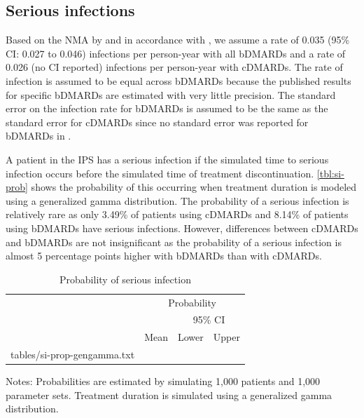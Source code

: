 \documentclass[11pt,final,fleqn]{article}\usepackage[]{graphicx}\usepackage[]{color}
\makeatletter
\theoremstyle{plain}
\newcommand*\ExpandableInput[1]{\@@input#1 }
\makeatother
\begin{document}
\subsection{Serious infections}
Based on the NMA by \citet{singh2011adverse} and in accordance with \citet{stevenson2016adalimumab}, we assume a rate of 0.035 (95\% CI: 0.027 to 0.046) infections per person-year with all bDMARDs and a rate of 0.026 (no CI reported) infections per person-year with cDMARDs. The rate of infection is assumed to be equal across bDMARDs because the published results for specific bDMARDs are estimated with very little precision. The standard error on the infection rate for bDMARDs is assumed to be the same as the standard error for cDMARDs since no standard error was reported for bDMARDs in \citet{singh2011adverse}.



A patient in the IPS has a serious infection if the simulated time to serious infection occurs before the simulated time of treatment discontinuation. \autoref{tbl:si-prob} shows the probability of this occurring when treatment duration is modeled using a generalized gamma distribution. The probability of a serious infection is relatively rare as only 3.49\% of patients using cDMARDs and 8.14\% of patients using bDMARDs have serious infections. However, differences between cDMARDs and bDMARDs are not insignificant as the probability of a serious infection is almost 5 percentage points higher with bDMARDs than with cDMARDs.

\begin{table}[!ht]
\begin{center}
\begin{threeparttable}
\caption{Probability of serious infection} \label{tbl:si-prob}
\begin{tabularx}{\textwidth}{@{\extracolsep{\fill}}lrrr}
\hline
\multicolumn{1}{l}{} & \multicolumn{3}{c}{Probability} \\
\cmidrule{2-4} 
\multicolumn{2}{l}{} & \multicolumn{2}{c}{95\% CI} \\
\cmidrule{3-4} 
\multicolumn{1}{c}{} & \multicolumn{1}{c}{Mean} & \multicolumn{1}{c}{Lower} & \multicolumn{1}{c}{Upper} \\
\hline
\ExpandableInput{tables/si-prop-gengamma.txt}
\hline
\end{tabularx}
\scriptsize
Notes: Probabilities are estimated by simulating 1,000 patients and 1,000 parameter sets. Treatment duration is simulated using a generalized gamma distribution. 
\end{threeparttable}
\end{center}
\end{table}
\end{document}
